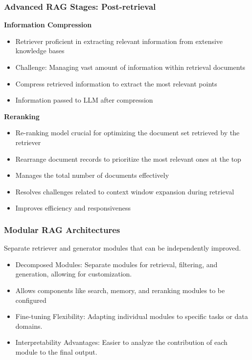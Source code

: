 \begin{frame}[fragile]\frametitle{Advanced RAG Stages: Post-retrieval}
\textbf{Information Compression}
  \begin{itemize}
    \item Retriever proficient in extracting relevant information from extensive knowledge bases
    \item Challenge: Managing vast amount of information within retrieval documents
    \item Compress retrieved information to extract the most relevant points
    \item Information passed to LLM after compression
  \end{itemize}
\textbf{Reranking}
  \begin{itemize}
    \item Re-ranking model crucial for optimizing the document set retrieved by the retriever
    \item Rearrange document records to prioritize the most relevant ones at the top
    \item Manages the total number of documents effectively
    \item Resolves challenges related to context window expansion during retrieval
    \item Improves efficiency and responsiveness
  \end{itemize}
\end{frame}


\begin{frame}[fragile]\frametitle{Modular RAG Architectures}

Separate retriever and generator modules that can be independently improved.

\begin{itemize}
\item Decomposed Modules: Separate modules for retrieval, filtering, and generation, allowing for customization.
\item Allows components like search, memory, and reranking modules to be configured
\item Fine-tuning Flexibility: Adapting individual modules to specific tasks or data domains.
\item Interpretability Advantages: Easier to analyze the contribution of each module to the final output.
\end{itemize}	

\end{frame}



